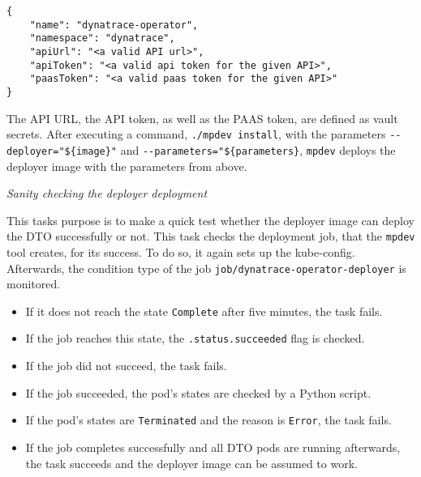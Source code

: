 \begin{verbatim}
{
    "name": "dynatrace-operator",
    "namespace": "dynatrace",
    "apiUrl": "<a valid API url>",
    "apiToken": "<a valid api token for the given API>",
    "paasToken": "<a valid paas token for the given API>"
}
\end{verbatim}

The API URL, the API token, as well as the PAAS token, are defined as vault secrets.
After executing a command, \verb|./mpdev install|, with the parameters \verb|--deployer="${image}"| and \verb|--parameters="${parameters}|, \verb|mpdev| deploys the deployer image with the parameters from above.

\textit{Sanity checking the deployer deployment}

This tasks purpose is to make a quick test whether the deployer image can deploy the DTO successfully or not.
This task checks the deployment job, that the \verb|mpdev| tool creates, for its success.
To do so, it again sets up the kube-config.
Afterwards, the condition type of the job \verb|job/dynatrace-operator-deployer| is monitored.

\begin{itemize}
    \item If it does not reach the state \verb|Complete| after five minutes, the task fails.
    \item If the job reaches this state, the \verb|.status.succeeded| flag is checked.
    \item If the job did not succeed, the task fails.
    \item If the job succeeded, the pod's states are checked by a Python script.
    \item If the pod's states are \verb|Terminated| and the reason is \verb|Error|, the task fails.
    \item If the job completes successfully and all DTO pods are running afterwards, the task succeeds and the deployer image can be assumed to work.
\end{itemize}
